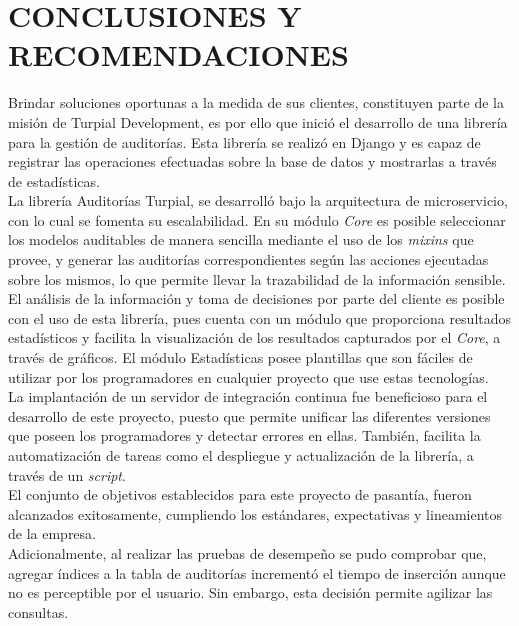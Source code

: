 \chapter*{\textbf{CONCLUSIONES Y RECOMENDACIONES}}

\thispagestyle{empty}

Brindar soluciones oportunas a la medida de sus clientes, constituyen parte de la misión de Turpial Development, es por ello que inició el desarrollo de una librería para la gestión de auditorías. Esta librería se realizó en Django y es capaz de registrar las operaciones efectuadas sobre la base de datos y mostrarlas a través de estadísticas.\\

La librería Auditorías Turpial, se desarrolló bajo la arquitectura de microservicio, con lo cual se fomenta su escalabilidad. En su módulo \textit{Core} es posible seleccionar los modelos auditables de manera sencilla mediante el uso de los \textit{mixins} que provee, y generar las auditorías correspondientes según las acciones ejecutadas sobre los mismos, lo que permite llevar la trazabilidad de la información sensible.\\

El análisis de la información y toma de decisiones por parte del cliente es posible con el uso de esta librería, pues cuenta con un módulo que proporciona resultados estadísticos y facilita la visualización de los resultados capturados por el \textit{Core}, a través de gráficos. El módulo Estadísticas posee plantillas que son fáciles de utilizar por los programadores en cualquier proyecto que use estas tecnologías.\\

La implantación de un servidor de integración continua fue beneficioso para el desarrollo de este proyecto, puesto que permite unificar las diferentes versiones que poseen los programadores y detectar errores en ellas. También, facilita la automatización de tareas como el despliegue y actualización de la librería, a través de un \textit{script}.\\

El conjunto de objetivos establecidos para este proyecto de pasantía, fueron alcanzados  exitosamente, cumpliendo los estándares, expectativas y lineamientos de la empresa.\\

Adicionalmente, al realizar las pruebas de desempeño se pudo comprobar que, agregar índices a la tabla de auditorías incrementó el tiempo de inserción aunque no es perceptible por el usuario. Sin embargo, esta decisión permite agilizar las consultas.\\

